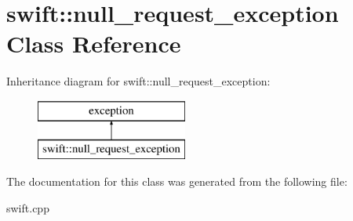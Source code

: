 \hypertarget{classswift_1_1null__request__exception}{\section{swift\-:\-:null\-\_\-request\-\_\-exception Class Reference}
\label{classswift_1_1null__request__exception}
}
Inheritance diagram for swift\-:\-:null\-\_\-request\-\_\-exception\-:\begin{figure}[H]
\begin{center}
\leavevmode
\includegraphics[height=2.000000cm]{classswift_1_1null__request__exception}
\end{center}
\end{figure}


The documentation for this class was generated from the following file\-:\begin{DoxyCompactItemize}
\item 
swift.\-cpp\end{DoxyCompactItemize}
